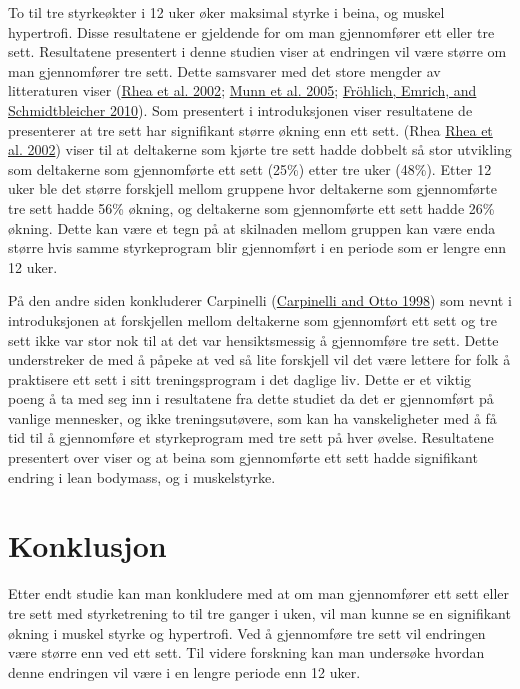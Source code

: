 \documentclass[
]{book}
\begin{document}
To til tre styrkeøkter i 12 uker øker maksimal styrke i beina, og muskel
hypertrofi. Disse resultatene er gjeldende for om man gjennomfører ett
eller tre sett. Resultatene presentert i denne studien viser at
endringen vil være større om man gjennomfører tre sett. Dette samsvarer
med det store mengder av litteraturen viser
(\protect\hyperlink{ref-rhea2002}{Rhea et al. 2002};
\protect\hyperlink{ref-munn2005}{Munn et al. 2005};
\protect\hyperlink{ref-fruxf6hlich2010}{Fröhlich, Emrich, and
Schmidtbleicher 2010}). Som presentert i introduksjonen viser
resultatene de presenterer at tre sett har signifikant større økning enn
ett sett. (Rhea \protect\hyperlink{ref-rhea2002}{Rhea et al. 2002})
viser til at deltakerne som kjørte tre sett hadde dobbelt så stor
utvikling som deltakerne som gjennomførte ett sett (25\%) etter tre uker
(48\%). Etter 12 uker ble det større forskjell mellom gruppene hvor
deltakerne som gjennomførte tre sett hadde 56\% økning, og deltakerne
som gjennomførte ett sett hadde 26\% økning. Dette kan være et tegn på
at skilnaden mellom gruppen kan være enda større hvis samme
styrkeprogram blir gjennomført i en periode som er lengre enn 12 uker.

På den andre siden konkluderer Carpinelli
(\protect\hyperlink{ref-carpinelli1998}{Carpinelli and Otto 1998}) som
nevnt i introduksjonen at forskjellen mellom deltakerne som gjennomført
ett sett og tre sett ikke var stor nok til at det var hensiktsmessig å
gjennomføre tre sett. Dette understreker de med å påpeke at ved så lite
forskjell vil det være lettere for folk å praktisere ett sett i sitt
treningsprogram i det daglige liv. Dette er et viktig poeng å ta med seg
inn i resultatene fra dette studiet da det er gjennomført på vanlige
mennesker, og ikke treningsutøvere, som kan ha vanskeligheter med å få
tid til å gjennomføre et styrkeprogram med tre sett på hver øvelse.
Resultatene presentert over viser og at beina som gjennomførte ett sett
hadde signifikant endring i lean bodymass, og i muskelstyrke.

\hypertarget{konklusjon-1}{%
\section{Konklusjon}\label{konklusjon-1}}

Etter endt studie kan man konkludere med at om man gjennomfører ett sett
eller tre sett med styrketrening to til tre ganger i uken, vil man kunne
se en signifikant økning i muskel styrke og hypertrofi. Ved å
gjennomføre tre sett vil endringen være større enn ved ett sett. Til
videre forskning kan man undersøke hvordan denne endringen vil være i en
lengre periode enn 12 uker.
\end{document}
